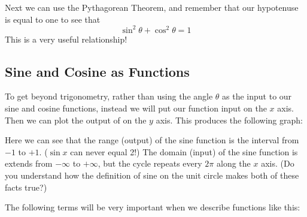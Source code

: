 Next we can use the Pythagorean Theorem, and remember that our hypotenuse is equal to one to see that
\[ \sin^2 \theta + \cos^2 \theta = 1 \]
This is a very useful relationship!


\subsection*{Sine and Cosine as Functions} 

To get beyond trigonometry, rather than using the angle $\theta$ as the input to our sine
and cosine functions, instead we will put our function input on the $x$ axis.  Then we can
plot the output of on the $y$ axis.  This produces the following graph:
\begin{center}
\end{center}


\noindent
Here we can see that the range (output) of the sine function is the interval from $-1$ to $+1$.  ($\sin x$ can never equal 2!)  The domain (input) of the sine function is extends from $-\infty$ to $+\infty$, but the cycle repeats every $2 \pi$ along the $x$ axis.  (Do you understand how the definition of sine on the unit circle makes both of these facts true?)

The following terms will be very important when we describe functions like this:

